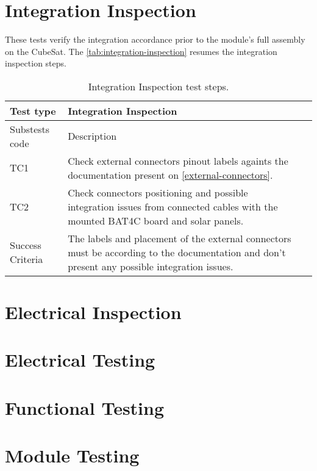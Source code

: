 \section{Integration Inspection}

These tests verify the integration accordance prior to the module's full assembly on the CubeSat.
The \autoref{tab:integration-inspection} resumes the integration inspection steps. 

\begin{table}[!htb]
\centering
\caption{Integration Inspection test steps.}
\label{tab:integration-inspection}
\begin{tabular}{m{3cm} m{12cm} m{3cm}}
\toprule
Test type & Integration Inspection \\
\midrule
\midrule
Substests code & Description \\ 
\midrule
TC1 & Check external connectors pinout labels againts the documentation present on \autoref{external-connectors}. \\
\midrule
TC2 & Check connectors positioning and possible integration issues from connected cables with the mounted BAT4C board and solar panels. \\
\midrule
\midrule
Success Criteria & The labels and placement of the external connectors must be according to the documentation and don't present any possible integration issues. \\
\bottomrule
\end{tabular}
\end{table}

\section {Electrical Inspection}

\section {Electrical Testing}

\section {Functional Testing}
 
\section {Module Testing}
